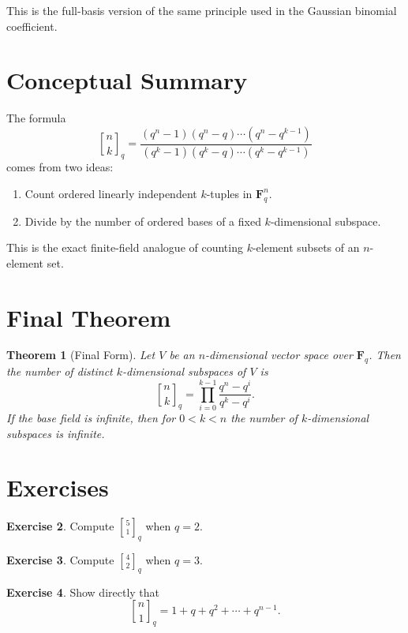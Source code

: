 \documentclass[11pt]{article}
\newtheorem{theorem}{Theorem}[section]
\theoremstyle{definition}
\newtheorem{exercise}[theorem]{Exercise}
\theoremstyle{remark}
\newcommand{\F}{\mathbf{F}}
\newcommand{\qbinom}[2]{\genfrac{[}{]}{0pt}{}{#1}{#2}_q}
\begin{document}
	This is the full-basis version of the same principle used in the Gaussian binomial coefficient.
	
	\section{Conceptual Summary}
	
	The formula
	\[
	\qbinom{n}{k}
	=
	\frac{(q^n-1)(q^n-q)\cdots(q^n-q^{k-1})}
	{(q^k-1)(q^k-q)\cdots(q^k-q^{k-1})}
	\]
	comes from two ideas:
	
	\begin{enumerate}[label=\arabic*.]
		\item Count ordered linearly independent \(k\)-tuples in \(\F_q^n\).
		\item Divide by the number of ordered bases of a fixed \(k\)-dimensional subspace.
	\end{enumerate}
	
	This is the exact finite-field analogue of counting \(k\)-element subsets of an \(n\)-element set.
	
	\section{Final Theorem}
	
	\begin{theorem}[Final Form]
		Let \(V\) be an \(n\)-dimensional vector space over \(\F_q\). Then the number of distinct \(k\)-dimensional subspaces of \(V\) is
		\[
		\boxed{
			\qbinom{n}{k}
			=
			\prod_{i=0}^{k-1}\frac{q^n-q^i}{q^k-q^i}
		}.
		\]
		If the base field is infinite, then for \(0<k<n\) the number of \(k\)-dimensional subspaces is infinite.
	\end{theorem}
	
	\section{Exercises}
	
	\begin{exercise}
		Compute \(\qbinom{5}{1}\) when \(q=2\).
	\end{exercise}
	
	\begin{exercise}
		Compute \(\qbinom{4}{2}\) when \(q=3\).
	\end{exercise}
	
	\begin{exercise}
		Show directly that
		\[
		\qbinom{n}{1}=1+q+q^2+\cdots+q^{n-1}.
		\]
	\end{exercise}
	
\end{document}
